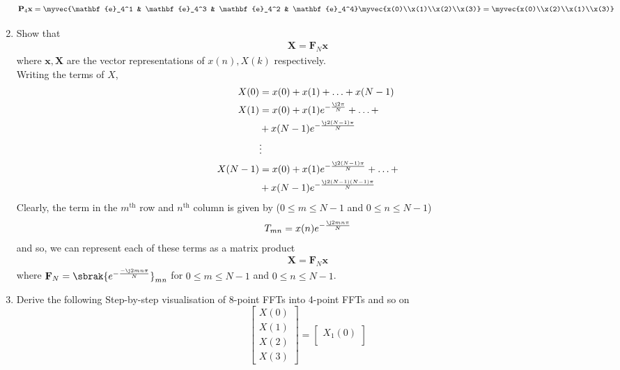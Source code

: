 \documentclass[journal,12pt,twocolumn]{IEEEtran}
\let\vec\mathbf
\renewcommand\thesection{\arabic{section}}
\begin{document}
\begin{enumerate}[label=\thesection.\arabic*.,ref=\thesection.\theenumi]
\begin{align}
	\vec{P}_4\vec{x} = \myvec{\vec{e}_4^1 & \vec{e}_4^3 & \vec{e}_4^2 & \vec{e}_4^4}\myvec{x(0)\\x(1)\\x(2)\\x(3)} = \myvec{x(0)\\x(2)\\x(1)\\x(3)}
	\label{eq:x-permute}
\end{align}
\item Show that 
\begin{align}
\vec{X} = \vec{F}_N\vec{x}
\label{eq:dft-mat-def}
\end{align}
where $\vec{x}, \vec{X}$ are the vector representations of $x(n), X(k)$ respectively.\\
\solution Writing the terms of $X$, 
\begin{align}
X(0) &= x(0) + x(1) + \ldots + x(N - 1) \\
X(1) &= x(0) + x(1)e^{-\frac{\j2\pi}{N}} + \ldots + \nonumber \\
&+ x(N - 1)e^{-\frac{\j2(N - 1)\pi}{N}} \\
&\vdots \nonumber \\
X(N - 1) &= x(0) + x(1)e^{-\frac{\j2(N - 1)\pi}{N}} + \ldots + \nonumber \\
&+ x(N - 1)e^{-\frac{\j2(N - 1)(N - 1)\pi}{N}}	
\end{align}
Clearly, the term in the $m^{\text{th}}$ row and $n^{\text{th}}$ column is given by ($0 \leq m \leq N - 1$ and $0 \leq n \leq N - 1$) 
\begin{align}
T_{mn} = x(n)e^{-\frac{\j2mn\pi}{N}} 
\end{align}
and so, we can represent each of these terms as a matrix product
\begin{align}
\vec{X} = \vec{F}_N\vec{x}
\end{align}
where $\vec{F}_N = \sbrak{e^{-\frac{-\j2mn\pi}{N}}}_{mn}$ for $0 \leq m \leq N - 1$ and $0 \leq n \leq N - 1$. 
\item Derive the following Step-by-step visualisation  of
8-point FFTs into 4-point FFTs and so on
\begin{equation}
\begin{bmatrix}
	X(0) \\ 
	X(1) \\ 
	X(2) \\ 
	X(3)
\end{bmatrix}
=
\begin{bmatrix}
	X_{1}(0) \\ 

\end{bmatrix}
\end{equation}
\end{enumerate}
\end{document}
